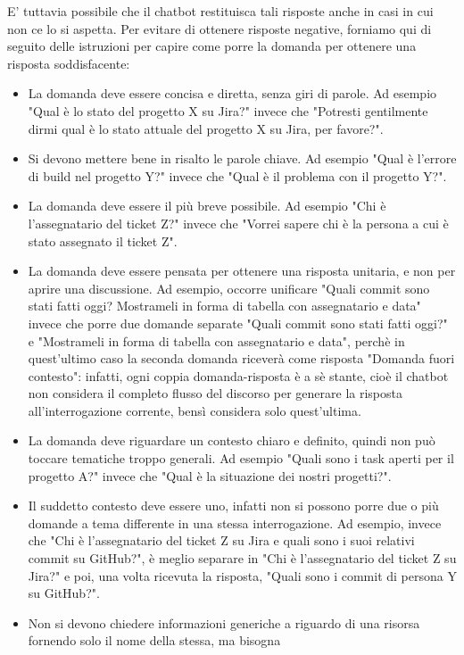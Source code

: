 E' tuttavia possibile che il chatbot restituisca tali risposte anche in casi in cui non ce lo si aspetta.
Per evitare di ottenere risposte negative, forniamo qui di seguito delle istruzioni per capire come porre la domanda per
ottenere una risposta soddisfacente:
\begin{itemize}
    \item La domanda deve essere concisa e diretta, senza giri di parole. Ad esempio "Qual è lo stato del progetto X su Jira?" invece
    che "Potresti gentilmente dirmi qual è lo stato attuale del progetto X su Jira, per favore?".
    \item Si devono mettere bene in risalto le parole chiave. Ad esempio "Qual è l'errore di build nel progetto Y?" invece che "Qual
    è il problema con il progetto Y?".
    \item La domanda deve essere il più breve possibile. Ad esempio "Chi è l'assegnatario del ticket Z?" invece che "Vorrei sapere
    chi è la persona a cui è stato assegnato il ticket Z".
    \item La domanda deve essere pensata per ottenere una risposta unitaria, e non per aprire una discussione. Ad esempio, occorre
    unificare "Quali commit sono stati fatti oggi? Mostrameli in forma di tabella con assegnatario e data" invece che porre due domande
    separate "Quali commit sono stati fatti oggi?" e "Mostrameli in forma di tabella con assegnatario e data", perchè in quest'ultimo
    caso la seconda domanda riceverà come risposta "Domanda fuori contesto": infatti, ogni coppia domanda-risposta è a sè stante, cioè
    il chatbot non considera il completo flusso del discorso per generare la risposta all'interrogazione corrente, bensì considera solo
    quest'ultima.
    \item La domanda deve riguardare un contesto chiaro e definito, quindi non può toccare tematiche troppo generali. Ad esempio
    "Quali sono i task aperti per il progetto A?" invece che "Qual è la situazione dei nostri progetti?".
    \item Il suddetto contesto deve essere uno, infatti non si possono porre due o più domande a tema differente in una stessa
    interrogazione. Ad esempio, invece che "Chi è l'assegnatario del ticket Z su Jira
    e quali sono i suoi relativi commit su GitHub?", è meglio separare in "Chi è l'assegnatario del ticket Z su Jira?" e poi, una 
    volta ricevuta la risposta, "Quali sono i commit di persona Y su GitHub?".
    \item Non si devono chiedere informazioni generiche a riguardo di una risorsa fornendo solo il nome della stessa, ma bisogna

\end{itemize}
